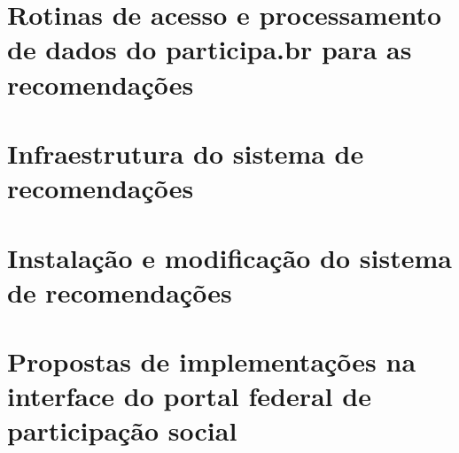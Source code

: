 \documentclass[12pt]{article}
\begin{document}
\section{Rotinas de acesso e processamento de dados do participa.br para as recomendações}\label{sec:algs}
\section{Infraestrutura do sistema de recomendações}
\section{Instalação e modificação do sistema de recomendações}
\section{Propostas de implementações na interface do portal federal de participação social}\label{sec:acr}
\end{document}

